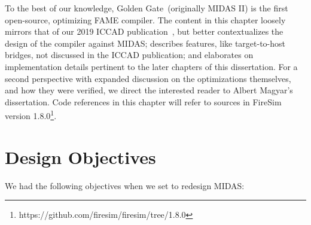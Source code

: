 To the best of our knowledge, Golden Gate~(originally MIDAS II) is the first
open-source, optimizing FAME compiler. The content in this chapter loosely
mirrors that of our 2019 ICCAD publication~\cite{GoldenGate}, but better
contextualizes the design of the compiler against MIDAS; describes features,
like target-to-host bridges, not discussed in the ICCAD publication; and
elaborates on implementation details pertinent to the later chapters of this
dissertation.  For a second perspective with expanded discussion on the
optimizations themselves, and how they were verified, we direct the interested
reader to Albert Magyar's dissertation. Code references in this chapter will
refer to sources in FireSim version
1.8.0\footnote{https://github.com/firesim/firesim/tree/1.8.0}.

\section{Design Objectives}

We had the following objectives when we set to redesign MIDAS:

